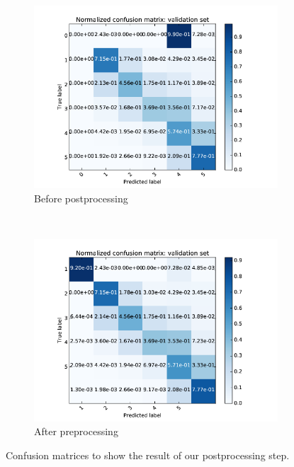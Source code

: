 \documentclass[a4paper,12pt]{article}
\begin{document}
\begin{figure}[ht!]
    \centering
    \begin{subfigure}[b]{0.48\textwidth}
        \includegraphics[width=\textwidth]{postprocessing_before.png}
        \caption{Before postprocessing}
        \label{fig:postprocessing-before}
    \end{subfigure}
    ~
    \begin{subfigure}[b]{0.48\textwidth}
        \includegraphics[width=\textwidth]{postprocessing_after.png}
        \caption{After preprocessing}
        \label{fig:postprocessing-after}
    \end{subfigure}
    \caption{Confusion matrices to show the result of our postprocessing step.}
    \label{fig:postprocessing}
\end{figure}
\end{document}
